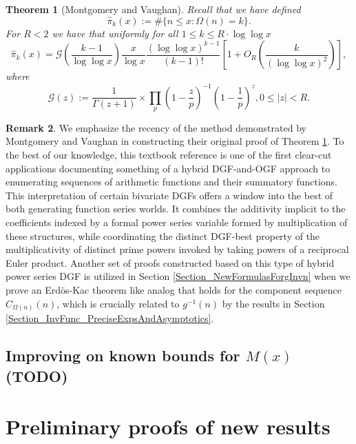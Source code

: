 \documentclass[11pt,reqno,a4letter]{article}
\numberwithin{figure}{section}
\numberwithin{table}{section}
\theoremstyle{plain}
\newtheorem{theorem}{Theorem}
\numberwithin{theorem}{section}
\theoremstyle{definition}
\newtheorem{remark}[theorem]{Remark}
\begin{document}
\begin{theorem}[Montgomery and Vaughan]
\label{theorem_HatPi_ExtInTermsOfGz} 
Recall that we have defined 
$$\widehat{\pi}_k(x) := \#\{n \leq x: \Omega(n)=k\}.$$ 
For $R < 2$ we have that uniformly for all $1 \leq k \leq R \cdot \log\log x$ 
\[
\widehat{\pi}_k(x) = \mathcal{G}\left(\frac{k-1}{\log\log x}\right) \frac{x}{\log x} 
     \frac{(\log\log x)^{k-1}}{(k-1)!} \left[1 + O_R\left(\frac{k}{(\log\log x)^2}\right)\right], 
\]
where 
\[
\mathcal{G}(z) := \frac{1}{\Gamma(z+1)} \times 
     \prod_p \left(1-\frac{z}{p}\right)^{-1} \left(1-\frac{1}{p}\right)^z, 0 \leq |z| < R. 
\]
\end{theorem} 

\begin{remark} 
\label{remark_MV_NewDGFApplications} 
We emphasize the recency of the method demonstrated by 
Montgomery and Vaughan in constructing their original proof of 
Theorem \ref{theorem_HatPi_ExtInTermsOfGz}. 
To the best of our knowledge, this textbook reference is 
one of the first clear-cut applications documenting something of a hybrid 
DGF-and-OGF approach to enumerating sequences of arithmetic functions 
and their summatory functions. 
This interpretation of certain bivariate DGFs 
offers a window into the best of both generating function series worlds. 
It combines the additivity 
implicit to the coefficients indexed by a formal power series variable formed by 
multiplication of these structures, while coordinating the distinct DGF-best 
property of the multiplicativity of distinct prime powers invoked 
by taking powers of a reciprocal Euler product. 
Another set of proofs constructed based on this type of hybrid power series 
DGF is utilized in Section \ref{Section_NewFormulasForgInvn} 
when we prove an Erd\"os-Kac theorem like analog 
that holds for the component sequence $C_{\Omega(n)}(n)$, which is 
crucially related to $g^{-1}(n)$ by the 
results in Section \ref{Section_InvFunc_PreciseExpsAndAsymptotics}. 
\end{remark} 

\subsection{Improving on known bounds for $M(x)$ (TODO)} 

\newpage 
\section{Preliminary proofs of new results} 
\label{Section_PrelimProofs_Config} 
\end{document}
